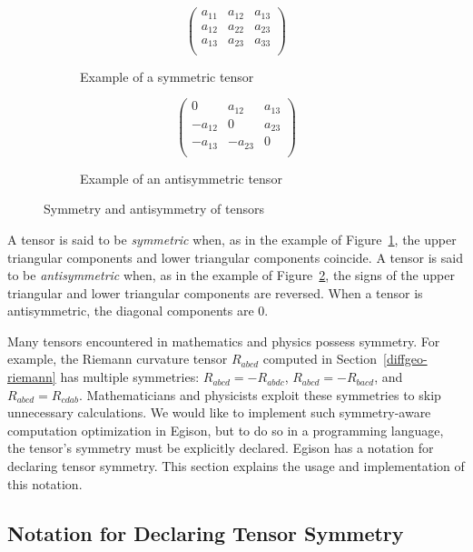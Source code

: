 \begin{figure}[t]
 \begin{subfigure}[b]{1.0\linewidth}
$$
\begin{pmatrix}
a_{11} & a_{12} & a_{13} \\
a_{12} & a_{22} & a_{23} \\
a_{13} & a_{23} & a_{33} \\
\end{pmatrix}
$$
  \caption{Example of a symmetric tensor}
  \label{fig:symmtensor}
 \end{subfigure}
  \medskip
 \begin{subfigure}[b]{1.0\linewidth}
$$
\begin{pmatrix}
0 & a_{12} & a_{13} \\
-a_{12} & 0 & a_{23} \\
-a_{13} & -a_{23} & 0 \\
\end{pmatrix}
$$
  \caption{Example of an antisymmetric tensor}
  \label{fig:antisymmtensor}
 \end{subfigure}
 \caption{Symmetry and antisymmetry of tensors}
 \label{fig:symm}
\end{figure}


A tensor is said to be \emph{symmetric} when, as in the example of Figure~\ref{fig:symmtensor}, the upper triangular components and lower triangular components coincide.
A tensor is said to be \emph{antisymmetric} when, as in the example of Figure~\ref{fig:antisymmtensor}, the signs of the upper triangular and lower triangular components are reversed.
When a tensor is antisymmetric, the diagonal components are 0.

Many tensors encountered in mathematics and physics possess symmetry.
For example, the Riemann curvature tensor $R_{abcd}$ computed in Section~\ref{diffgeo-riemann} has multiple symmetries: $R_{abcd} = -R_{abdc}$, $R_{abcd} = -R_{bacd}$, and $R_{abcd} = R_{cdab}$.
Mathematicians and physicists exploit these symmetries to skip unnecessary calculations.
We would like to implement such symmetry-aware computation optimization in Egison, but to do so in a programming language, the tensor's symmetry must be explicitly declared.
Egison has a notation for declaring tensor symmetry.
This section explains the usage and implementation of this notation.

\subsection{Notation for Declaring Tensor Symmetry}

